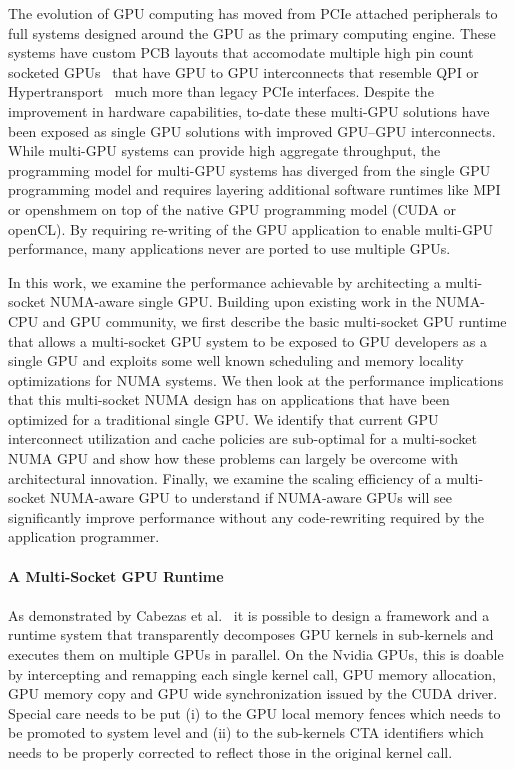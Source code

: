 The evolution of GPU computing has moved from PCIe attached peripherals to full 
systems designed around the GPU as the primary computing engine.  These systems 
have custom PCB layouts that accomodate multiple high pin count socketed 
GPUs~\cite{DGX} that have GPU to GPU interconnects that resemble QPI or 
Hypertransport~\cite{INTELQPI,AMDHT} much more than legacy PCIe interfaces.  
Despite the improvement in hardware capabilities, to-date these multi-GPU 
solutions have been exposed as single GPU solutions with improved GPU--GPU 
interconnects.  While multi-GPU systems can provide high aggregate throughput, 
the programming model for multi-GPU systems has diverged from the single GPU 
programming model and requires layering additional software runtimes like MPI 
or openshmem on top of the native GPU programming model (CUDA or openCL).  By 
requiring re-writing of the GPU application to enable multi-GPU performance, 
many applications never are ported to use multiple GPUs.

In this work, we examine the performance achievable by architecting a 
multi-socket NUMA-aware single GPU.  Building upon existing work in the 
NUMA-CPU and GPU community, we first describe the basic multi-socket GPU runtime 
that allows a multi-socket GPU system to be exposed to GPU developers as a 
single GPU and exploits some well known scheduling and memory locality 
optimizations for NUMA systems. We then look at the performance implications 
that this multi-socket NUMA design has on applications that have been optimized 
for a traditional single GPU.  We identify that current GPU interconnect 
utilization and cache policies are sub-optimal for a multi-socket NUMA GPU and 
show how these problems can largely be overcome with architectural innovation.  
Finally, we examine the scaling efficiency of a multi-socket NUMA-aware GPU to 
understand if NUMA-aware GPUs will see significantly improve performance  
without any code-rewriting required by the application programmer.
\\\\
\textbf{A Multi-Socket GPU Runtime}
\\\\
\noindent As demonstrated by Cabezas et al.~\cite{Cabezas2015} it is possible to design 
a framework and a runtime system that transparently decomposes GPU kernels in 
sub-kernels and executes them on multiple GPUs in parallel. On the Nvidia 
GPUs, this is doable by intercepting and remapping each single kernel call, 
GPU memory allocation, GPU memory copy and GPU wide synchronization issued by 
the CUDA driver. Special care needs to be put (i) to the GPU local memory 
fences which needs to be promoted to system level and (ii) to the 
sub-kernels CTA identifiers which needs to be properly corrected to 
reflect those in the original kernel call. 
 
